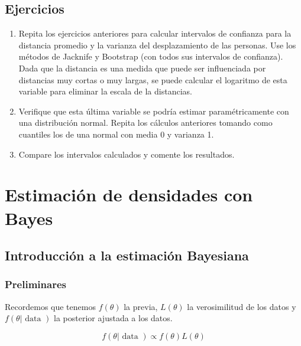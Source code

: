 \documentclass[
  12pt,
]{book}
\theoremstyle{definition}
\theoremstyle{definition}
\theoremstyle{definition}
\theoremstyle{remark}
\begin{document}
\hypertarget{ejercicios}{%
\section{Ejercicios}\label{ejercicios}}

\begin{enumerate}
\def\labelenumi{\arabic{enumi}.}
\item
  Repita los ejercicios anteriores para calcular intervalos de confianza para la distancia promedio y la varianza del desplazamiento de las personas. Use los métodos de Jacknife y Bootstrap (con todos sus intervalos de confianza).
  Dada que la distancia es una medida que puede ser influenciada por distancias muy cortas o muy largas, se puede calcular el logaritmo de esta variable para eliminar la escala de la distancias.
\item
  Verifique que esta última variable se podría estimar paramétricamente con una distribución normal.
  Repita los cálculos anteriores tomando como cuantiles los de una normal con media 0 y varianza 1.
\item
  Compare los intervalos calculados y comente los resultados.
\end{enumerate}

\hypertarget{estimaciuxf3n-de-densidades-con-bayes}{%
\chapter{Estimación de densidades con Bayes}\label{estimaciuxf3n-de-densidades-con-bayes}}

\hypertarget{introducciuxf3n-a-la-estimaciuxf3n-bayesiana}{%
\section{Introducción a la estimación Bayesiana}\label{introducciuxf3n-a-la-estimaciuxf3n-bayesiana}}

\hypertarget{preliminares}{%
\subsection{Preliminares}\label{preliminares}}

Recordemos que tenemos \(f(\theta)\) la previa, \(L(\theta)\) la
verosimilitud de los datos y \(f(\theta|\text { data })\) la posterior
ajustada a los datos.

\begin{equation*}
    f(\theta | \text { data }) \propto f(\theta) L(\theta)
\end{equation*}
\end{document}
